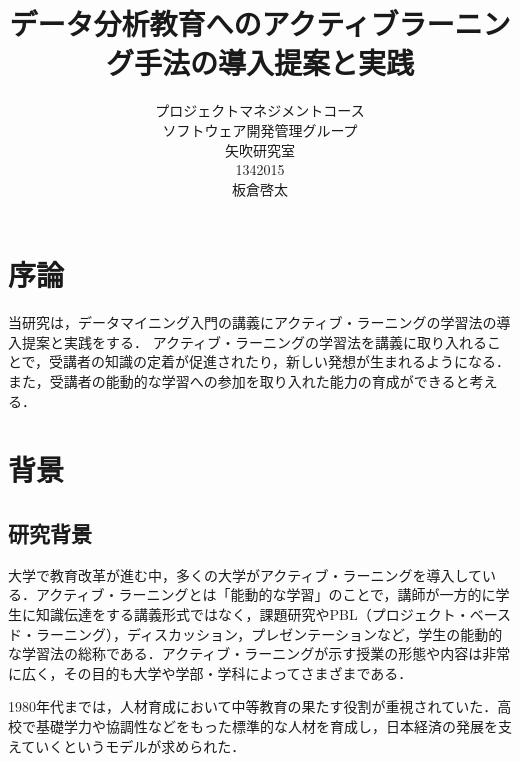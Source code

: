 \title{データ分析教育へのアクティブラーニング手法の導入提案と実践}
\author{プロジェクトマネジメントコース\\
ソフトウェア開発管理グループ\\
矢吹研究室\\
1342015\\
板倉啓太}
\date{}

\maketitle



\tableofcontents%

\chapter{序論}

当研究は，データマイニング入門の講義にアクティブ・ラーニングの学習法の導入提案と実践をする．
アクティブ・ラーニングの学習法を講義に取り入れることで，受講者の知識の定着が促進されたり，新しい発想が生まれるようになる．また，受講者の能動的な学習への参加を取り入れた能力の育成ができると考える．

\chapter{背景}
\section{研究背景}
大学で教育改革が進む中，多くの大学がアクティブ・ラーニングを導入している．アクティブ・ラーニングとは「能動的な学習」のことで，講師が一方的に学生に知識伝達をする講義形式ではなく，課題研究やPBL（プロジェクト・ベースド・ラーニング），ディスカッション，プレゼンテーションなど，学生の能動的な学習法の総称である．アクティブ・ラーニングが示す授業の形態や内容は非常に広く，その目的も大学や学部・学科によってさまざまである．

1980年代までは，人材育成において中等教育の果たす役割が重視されていた．高校で基礎学力や協調性などをもった標準的な人材を育成し，日本経済の発展を支えていくというモデルが求められた．

